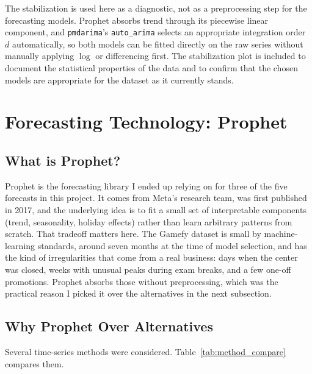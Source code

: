 \documentclass[12pt, a4paper]{report}
\begin{document}
The stabilization is used here as a diagnostic, not as a preprocessing step
for the forecasting models. Prophet absorbs trend through its piecewise
linear component, and \texttt{pmdarima}'s \texttt{auto\_arima} selects an
appropriate integration order~$d$ automatically, so both models can be fitted
directly on the raw series without manually applying $\log$ or differencing
first. The stabilization plot is included to document the statistical
properties of the data and to confirm that the chosen models are appropriate
for the dataset as it currently stands.

\section{Forecasting Technology: Prophet}

\subsection{What is Prophet?}

Prophet is the forecasting library I ended up relying on for three of the five
forecasts in this project. It comes from Meta's research team, was first published
in 2017, and the underlying idea is to fit a small set of interpretable components
(trend, seasonality, holiday effects) rather than learn arbitrary patterns from
scratch. That tradeoff matters here. The Gamefy dataset is small by machine-learning
standards, around seven months at the time of model selection, and has the kind of
irregularities that come from a real business: days when the center was closed,
weeks with unusual peaks during exam breaks, and a few one-off promotions. Prophet
absorbs those without preprocessing, which was the practical reason I picked it
over the alternatives in the next subsection.

\subsection{Why Prophet Over Alternatives}

Several time-series methods were considered. Table~\ref{tab:method_compare} compares
them.
\end{document}

